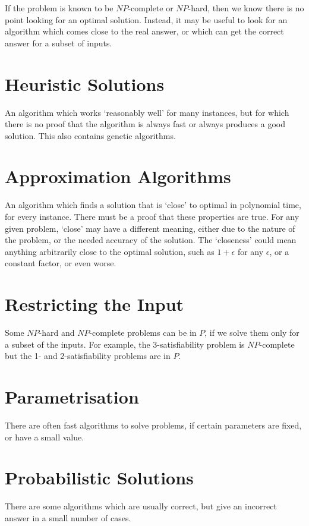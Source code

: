 
If the problem is known to be $NP$-complete or $NP$-hard, then we know there is no point looking for an optimal solution.
 Instead, it may be useful to look for an algorithm which comes close to the real answer, or which can get the correct
 answer for a subset of inputs.

\section*{Heuristic Solutions}

An algorithm which works `reasonably well' for many instances, but for which there is no proof that the algorithm is
 always fast or always produces a good solution. This also contains genetic algorithms.

\section*{Approximation Algorithms}

An algorithm which finds a solution that is `close' to optimal in polynomial time, for every instance. There must be a
 proof that these properties are true. For any given problem, `close' may have a different meaning, either due to the
 nature of the problem, or the needed accuracy of the solution. The `closeness' could mean anything arbitrarily close
 to the optimal solution, such as $1 + \epsilon$ for any $\epsilon$, or a constant factor, or even worse.

\section*{Restricting the Input}

Some $NP$-hard and $NP$-complete problems can be in $P$, if we solve them only for a subset of the inputs. For example,
 the 3-satisfiability problem is $NP$-complete but the 1- and 2-satisfiability problems are in $P$.

\section*{Parametrisation}

There are often fast algorithms to solve problems, if certain parameters are fixed, or have a small value.

\section*{Probabilistic Solutions}

There are some algorithms which are usually correct, but give an incorrect answer in a small number of cases.